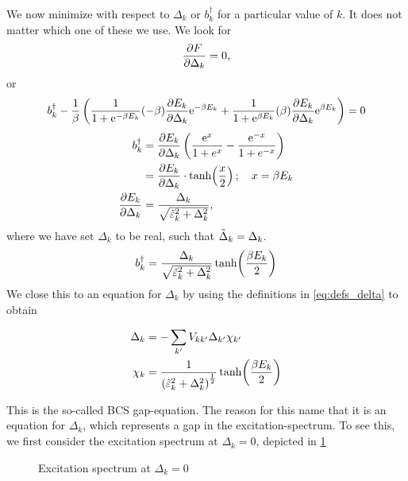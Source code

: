 We now minimize with respect to $\Delta_k$ or $b_k^\dagger$ for a particular value of $k$. It does not matter which one of these we use. We look for 
\begin{equation}
\pdv{F}{\Delta_k} = 0,
\end{equation}
or
\begin{equation*}
b_k^\dagger - \frac1\beta\left(\frac{1}{1+\mathrm{e}^{-\beta E_k}}(-\beta)\pdv{E_k}{\Delta_k}\mathrm{e}^{-\beta E_k} + \frac{1}{1+\mathrm{e}^{\beta E_k}}(\beta)\pdv{E_k}{\Delta_k}\mathrm{e}^{\beta E_k}\right) = 0
\end{equation*}
\begin{align*}
b_k^\dagger &= \pdv{E_k}{\Delta_k}\left(\frac{\mathrm{e}^x}{1+e^x} -\frac{\mathrm{e}^{-x}}{1+e^{-x}}\right) \\
&= \pdv{E_k}{\Delta_k}\cdot\tanh(\frac{x}{2})\, ;\quad x= \beta E_k \\
\pdv{E_k}{\Delta_k} &= \frac{\Delta_k}{\sqrt{\tilde{\varepsilon}_k^2 + \Delta_k^2}},
\end{align*}
where we have set $\Delta_k$ to be real, such that $\tilde{\Delta}_k = \Delta_k$.
\begin{equation}
b_k^\dagger = \frac{\Delta_k}{\sqrt{\tilde{\varepsilon}_k^2 + \Delta_k^2}}\tanh(\frac{\beta E_k}{2})
\end{equation}
We close this to an equation for $\Delta_k$ by using the definitions in \cref{eq:defs_delta} to obtain
\begin{tcolorbox}
	\begin{align}
	\label{eq:BCS_gap}
	\Delta_k &= -\sum_{k'}V_{kk'}\Delta_{k'}\chi_{k'} \\
	\chi_k &= \frac{1}{\left(\tilde{\varepsilon}_k^2+\Delta_k^2\right)^\frac12}\tanh(\frac{\beta E_k}{2})
	\end{align}
\end{tcolorbox}
This is the so-called BCS gap-equation. The reason for this name that it is an equation for $\Delta_k$, which represents a gap in the excitation-spectrum. To see this, we first consider the excitation spectrum at $\Delta_k = 0$, depicted in \cref{fig:excitation_spectrum_no_delta}
\begin{figure}
	\centering
	\begin{subfigure}{0.49\linewidth}
		\centering
		
	\end{subfigure}
	\begin{subfigure}{0.49\linewidth}
		\centering
		
	\end{subfigure}

	\caption{Excitation spectrum at $\Delta_k = 0$}
	\label{fig:excitation_spectrum_no_delta}
\end{figure}
